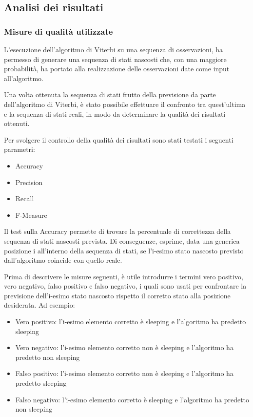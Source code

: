 \documentclass[10pt,a4paper]{article}
\begin{document}
	\subsection{Analisi dei risultati}
	
	\subsubsection{Misure di qualità utilizzate}
	
	L'esecuzione dell'algoritmo di Viterbi su una sequenza di osservazioni, ha permesso di generare una sequenza di stati nascosti che, con una maggiore probabilità, ha portato alla realizzazione delle osservazioni date come input all'algoritmo.
	
	Una volta ottenuta la sequenza di stati frutto della previsione da parte dell'algoritmo di Viterbi, è stato possibile effettuare il confronto tra quest'ultima e la sequenza di stati reali, in modo da determinare la qualità dei risultati ottenuti.
	
	Per svolgere il controllo della qualità dei risultati sono stati testati i seguenti parametri:
	
	\begin{itemize}
		\item Accuracy
		\item Precision
		\item Recall
		\item F-Measure
	\end{itemize}

	Il test sulla Accuracy permette di trovare la percentuale di correttezza della sequenza di stati nascosti prevista. Di conseguenze, esprime, data una generica posizione i all'interno della sequenza di stati, se l'i-esimo stato nascosto previsto dall'algoritmo coincide con quello reale.
	
	Prima di descrivere le misure seguenti, è utile introdurre i termini vero positivo, vero negativo, falso positivo e falso negativo, i quali sono usati per confrontare la previsione dell'i-esimo stato nascosto rispetto il corretto stato alla posizione desiderata. Ad esempio:

	\begin{itemize}
		\item Vero positivo: l'i-esimo elemento corretto è sleeping e l'algoritmo ha predetto sleeping
		\item Vero negativo: l'i-esimo elemento corretto non è sleeping e l'algoritmo ha predetto non sleeping
		\item Falso positivo: l'i-esimo elemento corretto non è sleeping e l'algoritmo ha predetto sleeping
		\item Falso negativo: l'i-esimo elemento corretto è sleeping e l'algoritmo ha predetto non sleeping
	\end{itemize}	
	
\end{document}
